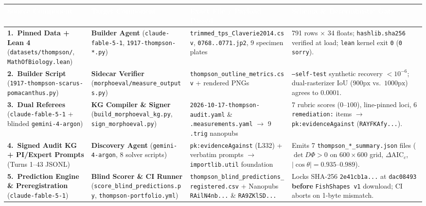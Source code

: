 \documentclass[10pt,a4paper]{article}
\begin{document}
\begin{table}[h!]
\centering
\renewcommand{\arraystretch}{1.05}
\scriptsize
\begin{tabular}{@{}p{}p{}p{}p{}@{}}
\toprule
\rowcolor{navybg}
\textcolor{white}{\textbf{Source Component}} & \textcolor{white}{\textbf{Target Component}} & \textcolor{white}{\textbf{Exact File / Payload Passed}} & \textcolor{white}{\textbf{Schema \& Deterministic Gate}} \\
\midrule
\rowcolor{softgray}
\textbf{1.\ Pinned Data + Lean 4} (\texttt{datasets/thompson/}, \texttt{MathOfBiology.lean}) & \textbf{Builder Agent} (\texttt{claude-fable-5-1}, \texttt{1917-thompson-*.py}) & \texttt{trimmed\_tps\_Claverie2014.csv}, \texttt{0768..0771.jp2}, 9 specimen plates & 791 rows $\times$ 34 floats; \texttt{hashlib.sha256} verified at load; \texttt{lean} kernel exit \texttt{0} (\texttt{0 sorry}). \\
\textbf{2.\ Builder Script} (\texttt{1917-thompson-scarus-pomacanthus.py}) & \textbf{Sidecar Verifier} (\texttt{morphoeval/measure\_outputs.py}) & \texttt{thompson\_outline\_metrics.csv} + rendered PNGs & \texttt{--self-test} synthetic recovery $<10^{-6}$; dual-rasterizer $\mathrm{IoU}$ ($900\text{px}$ vs.\ $1000\text{px}$) agrees to $0.0001$. \\
\rowcolor{softgray}
\textbf{3.\ Dual Referees} (\texttt{claude-fable-5-1} + blinded \texttt{gemini-4-argon}) & \textbf{KG Compiler \& Signer} (\texttt{build\_morphoeval\_kg.py}, \texttt{sign\_morphoeval.py}) & \texttt{2026-10-17-thompson-audit.yaml} \& \texttt{.measurements.yaml} $\to$ 9 \texttt{.trig} nanopubs & 7 rubric scores ($0\text{--}100$), line-pinned loci, 6 \texttt{remediation:} items $\to$ \texttt{pk:evidenceAgainst} (\texttt{RAYFKAfy...}). \\
\textbf{4.\ Signed Audit KG + PI/Expert Prompts} (Turns 1--43 JSONL) & \textbf{Discovery Agent} (\texttt{gemini-4-argon}, 8 solver scripts) & \texttt{pk:evidenceAgainst} (L332) + verbatim prompts $\to$ \texttt{importlib.util} foundation & Emits 7 \texttt{thompson\_*\_summary.json} files ($\det D\Phi > 0$ on $600\times 600$ grid, $\Delta\mathrm{AIC}_c$, $|\cos\theta|=0.935\text{--}0.989$). \\
\rowcolor{softgray}
\textbf{5.\ Prediction Engine \& Preregistration} (\texttt{claude-fable-5-1}) & \textbf{Blind Scorer \& CI Runner} (\texttt{score\_blind\_predictions.py}, \texttt{thompson-portfolio.yml}) & \texttt{thompson\_blind\_predictions\_registered.csv} + Nanopubs \texttt{RAilN4nb...} \& \texttt{RA9ZKlSD...} & Locks SHA-256 \texttt{2e41cb1a...} at \texttt{dac08493} \textbf{before} \texttt{FishShapes v1} download; CI aborts on 1-byte mismatch. \\
\bottomrule
\end{tabular}
\end{table}
\end{document}
